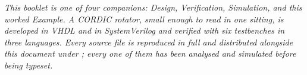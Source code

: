 \cleardoublepage
\thispagestyle{empty}
\vspace*{\fill}
\begin{center}
\begin{minipage}{0.78\textwidth}
\small\itshape
This booklet is one of four companions: Design, Verification, Simulation,
and this worked Example. A CORDIC rotator, small enough to read in one
sitting, is developed in VHDL and in SystemVerilog and verified with six
testbenches in three languages. Every source file is reproduced in full and
distributed alongside this document under ; every one of
them has been analysed and simulated before being typeset.
\end{minipage}
\end{center}
\vspace*{\fill}
\cleardoublepage

